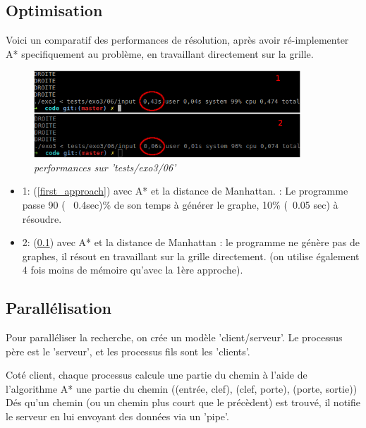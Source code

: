 \documentclass[10pt]{article}
\begin{document}
		\subsection{Optimisation} \label{ssec:optimisation}
			Voici un comparatif des performances de résolution, après avoir ré-implementer A* specifiquement au problème,
			en travaillant directement sur la grille.
			\begin{figure}[H]
				\begin{center}
					\includegraphics[width=10cm,height=\textheight,keepaspectratio]{./images/manhattan_performances.png}
				\end{center}
				\caption{\textit{performances sur 'tests/exo3/06'}}
			\end{figure}

			\begin{itemize}[label=-]
				\setlength\itemsep{0.1em}
				\item 1: (\ref{first_approach}) avec A* et la distance de Manhattan. : Le programme passe 90 (~ 0.4sec)\%
				de son temps à générer le graphe, 10\% (~0.05 sec) à résoudre.
				\item 2: (\ref{ssec:optimisation}) avec A* et la distance de Manhattan : le programme ne génère pas de graphes, il résout
				en travaillant sur la grille directement. (on utilise également 4 fois moins de mémoire qu'avec la 1ère approche).
			\end{itemize}

		\subsection{Parallélisation}
			Pour paralléliser la recherche, on crée un modèle 'client/serveur'.
			Le processus père est le 'serveur', et les processus fils sont les 'clients'.\newline

			Coté client, chaque processus calcule une partie du chemin à l'aide de l'algorithme A*
			une partie du chemin ((entrée, clef), (clef, porte), (porte, sortie))
			Dés qu'un chemin (ou un chemin plus court que le précèdent) est trouvé, il notifie le serveur
			en lui envoyant des données via un 'pipe'.\newline
			
\end{document}

